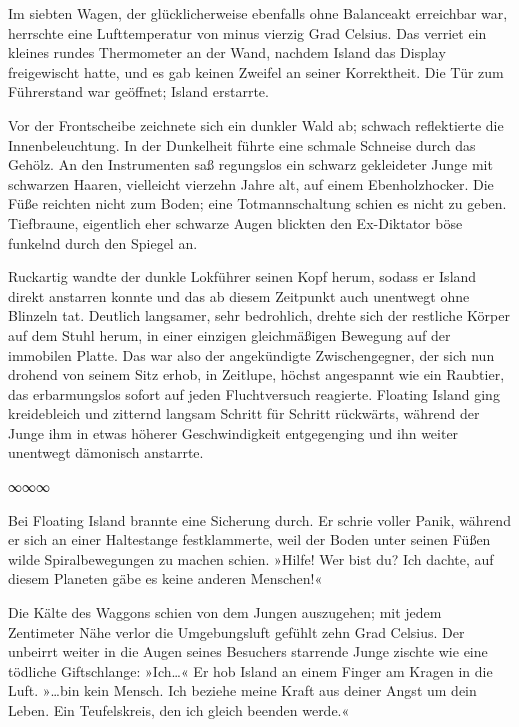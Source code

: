 Im siebten Wagen, der glücklicherweise ebenfalls ohne Balanceakt erreichbar war, herrschte eine Lufttemperatur von minus vierzig Grad Celsius. Das verriet ein kleines rundes Thermometer an der Wand, nachdem Island das Display freigewischt hatte, und es gab keinen Zweifel an seiner Korrektheit. Die Tür zum Führerstand war geöffnet; Island erstarrte.

Vor der Frontscheibe zeichnete sich ein dunkler Wald ab; schwach reflektierte die Innenbeleuchtung. In der Dunkelheit führte eine schmale Schneise durch das Gehölz. An den Instrumenten saß regungslos ein schwarz gekleideter Junge mit schwarzen Haaren, vielleicht vierzehn Jahre alt, auf einem Ebenholzhocker. Die Füße reichten nicht zum Boden; eine Totmannschaltung schien es nicht zu geben. Tiefbraune, eigentlich eher schwarze Augen blickten den Ex-Diktator böse funkelnd durch den Spiegel an.

Ruckartig wandte der dunkle Lokführer seinen Kopf herum, sodass er Island direkt anstarren konnte und das ab diesem Zeitpunkt auch unentwegt ohne Blinzeln tat. Deutlich langsamer, sehr bedrohlich, drehte sich der restliche Körper auf dem Stuhl herum, in einer einzigen gleichmäßigen Bewegung auf der immobilen Platte. Das war also der angekündigte Zwischengegner, der sich nun drohend von seinem Sitz erhob, in Zeitlupe, höchst angespannt wie ein Raubtier, das erbarmungslos sofort auf jeden Fluchtversuch reagierte. Floating Island ging kreidebleich und zitternd langsam Schritt für Schritt rückwärts, während der Junge ihm in etwas höherer Geschwindigkeit entgegenging und ihn weiter unentwegt dämonisch anstarrte.

\begin{center}
∞∞∞
\end{center}

Bei Floating Island brannte eine Sicherung durch. Er schrie voller Panik, während er sich an einer Haltestange festklammerte, weil der Boden unter seinen Füßen wilde Spiralbewegungen zu machen schien. »Hilfe!  Wer bist du? Ich dachte, auf diesem Planeten gäbe es keine anderen Menschen!«

Die Kälte des Waggons schien von dem Jungen auszugehen; mit jedem Zentimeter Nähe verlor die Umgebungsluft gefühlt zehn Grad Celsius. Der unbeirrt weiter in die Augen seines Besuchers starrende Junge zischte wie eine tödliche Giftschlange: »Ich…« Er hob Island an einem Finger am Kragen in die Luft. »…bin kein Mensch. Ich beziehe meine Kraft aus deiner Angst um dein Leben. Ein Teufelskreis, den ich gleich beenden werde.«

